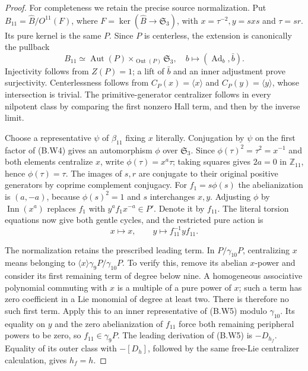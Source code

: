 \begin{proof}
For completeness we retain the precise source normalization.
Put $B_{11}=\widehat B/O^{11}(F)$, where
$F=\ker(\widehat B\to\mathfrak S_3)$, with
$x=\tau^{-2},y=sxs$ and $\tau=sr$.
Its pure kernel is the same $P$. Since $P$ is centerless,
the extension is canonically the pullback
\[
 B_{11}\simeq\operatorname{Aut}(P)
       \mathbin{\times_{\operatorname{Out}(P)}}\mathfrak S_3,
 \quad b\longmapsto(\operatorname{Ad}_b,\bar b).           \tag{B.W4}
\]
Injectivity follows from $Z(P)=1$; a lift of $\bar b$
and an inner adjustment prove surjectivity. Centerlessness
follows from $C_P(x)=\langle x\rangle$ and
$C_P(y)=\langle y\rangle$, whose intersection is trivial.
The primitive-generator centralizer follows in every
nilpotent class by comparing the first nonzero Hall term,
and then by the inverse limit.

Choose a representative $\psi$ of $\beta_{11}$ fixing
$x$ literally. Conjugation by $\psi$ on the first
factor of (B.W4) gives an automorphism $\phi$ over
$\mathfrak S_3$. Since $\phi(\tau)^2=\tau^2=x^{-1}$
and both elements centralize $x$, write
$\phi(\tau)=x^a\tau$; taking squares gives $2a=0$
in $\mathbb Z_{11}$, hence $\phi(\tau)=\tau$.
The images of $s,r$ are conjugate to their original
positive generators by coprime complement conjugacy.
For $f_1=s\phi(s)$ the abelianization is $(a,-a)$,
because $\phi(s)^2=1$ and $s$ interchanges $x,y$.
Adjusting $\phi$ by $\operatorname{Inn}(x^a)$ replaces
$f_1$ with $y^af_1x^{-a}\in P'$. Denote it by $f_{11}$.
The literal torsion equations now give both gentle
cycles, and the restricted pure action is
\[
             x\longmapsto x,\qquad
             y\longmapsto f_{11}^{-1}yf_{11}.             \tag{B.W5}
\]

The normalization retains the prescribed leading term.
In $P/\gamma_{10}P$, centralizing $x$ means belonging
to $\langle x\rangle\gamma_9P/\gamma_{10}P$.
To verify this, remove its abelian $x$-power and
consider its first remaining term of degree below nine.
A homogeneous associative polynomial commuting with $x$
is a multiple of a pure power of $x$; such a term has
zero coefficient in a Lie monomial of degree at least two.
There is therefore no such first term. Apply this to
an inner representative of (B.W5) modulo $\gamma_{10}$.
Its equality on $y$ and the zero abelianization of
$f_{11}$ force both remaining peripheral powers to be
zero, so $f_{11}\in\gamma_9P$. The leading derivation
of (B.W5) is $-D_{h_f}$. Equality of its outer class
with $-[D_h]$, followed by the same free-Lie
centralizer calculation, gives $h_f=h$.


\end{proof}
